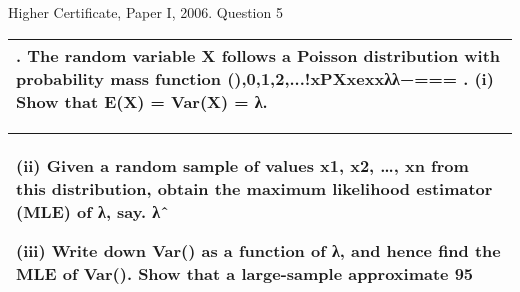 \documentclass[a4paper,12pt]{article}
\begin{document}
Higher Certificate, Paper I, 2006. Question 5

\begin{table}[ht!]
     
\centering
     
\begin{tabular}{|p{15cm}|}
     
\hline        

\noindent
5. The random variable X follows a Poisson distribution with probability mass function
(),0,1,2,...!xPXxexxλλ−=== .
(i) Show that E(X) = Var(X) = λ.
\\ \hline
      
\end{tabular}
    
\end{table}



\begin{table}[ht!]
     
\centering
     
\begin{tabular}{|p{15cm}|}
     
\hline        

\noindent

(ii) Given a random sample of values x1, x2, …, xn from this distribution, obtain the maximum likelihood estimator (MLE) of λ, say. λˆ

(iii) Write down Var() as a function of λ, and hence find the MLE of Var(). Show that a large-sample approximate
95%
\\ \hline
      
\end{tabular}
    
\end{table}


\end{document}
